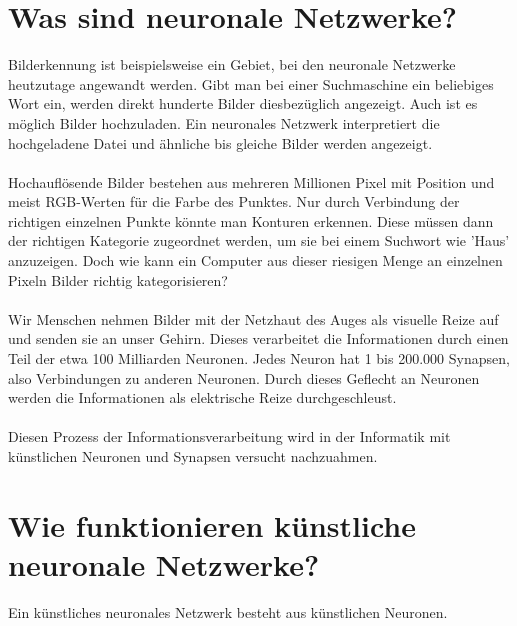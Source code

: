 \documentclass[12pt,oneside,a4paper,parskip]{scrbook}
\begin{document}
\section{Was sind neuronale Netzwerke?}
Bilderkennung ist beispielsweise ein Gebiet, bei den neuronale Netzwerke heutzutage angewandt werden. Gibt man bei einer Suchmaschine ein beliebiges Wort ein, werden direkt hunderte Bilder diesbezüglich angezeigt. Auch ist es möglich Bilder hochzuladen. Ein neuronales Netzwerk interpretiert die hochgeladene Datei und ähnliche bis gleiche Bilder werden angezeigt. 
\\\\
Hochauflösende Bilder bestehen aus mehreren Millionen Pixel mit Position und meist RGB-Werten für die Farbe des Punktes. 
Nur durch Verbindung der richtigen einzelnen Punkte könnte man Konturen erkennen. 
%
Diese müssen dann der richtigen Kategorie zugeordnet werden, um sie bei einem Suchwort wie 'Haus' anzuzeigen. Doch wie kann ein Computer aus dieser riesigen Menge an einzelnen Pixeln Bilder richtig kategorisieren?
\\\\
Wir Menschen nehmen Bilder mit der Netzhaut des Auges als visuelle Reize auf und senden sie an unser Gehirn. Dieses verarbeitet die Informationen durch einen Teil der etwa 100 Milliarden Neuronen. Jedes Neuron hat 1 bis 200.000 Synapsen, also Verbindungen zu anderen Neuronen. Durch dieses Geflecht an Neuronen werden die Informationen als elektrische Reize durchgeschleust. %
\\\\
Diesen Prozess der Informationsverarbeitung wird in der Informatik mit künstlichen Neuronen und Synapsen versucht nachzuahmen. 
\section{Wie funktionieren künstliche neuronale Netzwerke?}
Ein künstliches neuronales Netzwerk besteht aus künstlichen Neuronen.\\
\end{document}

